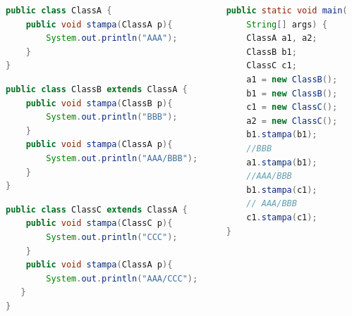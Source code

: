 \documentclass{beamer}
\begin{document}
\begin{frame}[fragile]
\begin{columns}
\begin{column}{0.6\textwidth}
\begin{lstlisting}[language=Java,escapechar=|]
public class ClassA {
    public void stampa(ClassA p){
        System.out.println("AAA");
    }
}
\end{lstlisting}
\begin{lstlisting}[language=Java,escapechar=|]
public class ClassB extends ClassA {
    public void stampa(ClassB p){
        System.out.println("BBB");
    }
    public void stampa(ClassA p){
        System.out.println("AAA/BBB");
    }
}
\end{lstlisting}
\begin{lstlisting}[language=Java,escapechar=|]
public class ClassC extends ClassA {
    public void stampa(ClassC p){
        System.out.println("CCC");
    }
    public void stampa(ClassA p){
        System.out.println("AAA/CCC");
   }
}
\end{lstlisting}
\end{column}
\begin{column}{0.4\textwidth}
\begin{lstlisting}[language=Java,escapechar=|]
public static void main(
    String[] args) {
    ClassA a1, a2;
    ClassB b1;
    ClassC c1;
    a1 = new ClassB();
    b1 = new ClassB();
    c1 = new ClassC();
    a2 = new ClassC();
    b1.stampa(b1); 
    //BBB
    a1.stampa(b1);  
    //AAA/BBB
    b1.stampa(c1); 
    // AAA/BBB
    c1.stampa(c1); 
}
\end{lstlisting}
\end{column}
\end{columns}
\end{frame}
\end{document}
